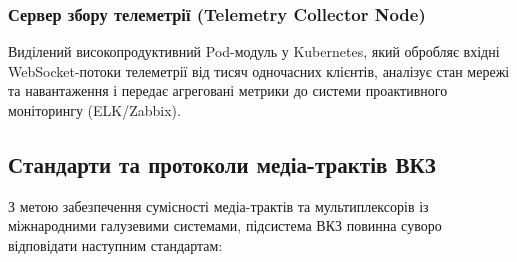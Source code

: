 \documentclass{article}
\begin{document}
\subsubsection{Сервер збору телеметрії (Telemetry Collector Node)}
Виділений високопродуктивний Pod-модуль у Kubernetes, який обробляє вхідні WebSocket-потоки телеметрії від тисяч одночасних клієнтів, аналізує стан мережі та навантаження і передає агреговані метрики до системи проактивного моніторингу (ELK/Zabbix).

\subsection{Стандарти та протоколи медіа-трактів ВКЗ}
З метою забезпечення сумісності медіа-трактів та мультиплексорів із міжнародними галузевими системами, підсистема ВКЗ повинна суворо відповідати наступним стандартам:
\end{document}
